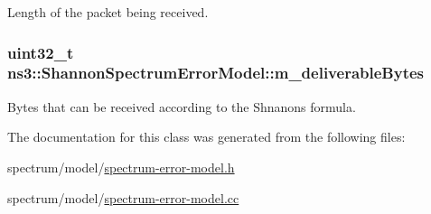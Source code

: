 Length of the packet being received. 

\subsubsection[{\texorpdfstring{m\+\_\+deliverable\+Bytes}{m_deliverableBytes}}]{\setlength{\rightskip}{0pt plus 5cm}uint32\+\_\+t ns3\+::\+Shannon\+Spectrum\+Error\+Model\+::m\+\_\+deliverable\+Bytes\hspace{0.3cm}{\ttfamily [private]}}\hypertarget{classns3_1_1ShannonSpectrumErrorModel_ab853a4be32cc3b07c30c4cd3182de48f}{}\label{classns3_1_1ShannonSpectrumErrorModel_ab853a4be32cc3b07c30c4cd3182de48f}


Bytes that can be received according to the Shnanon\textquotesingle{}s formula. 



The documentation for this class was generated from the following files\+:\begin{DoxyCompactItemize}
\item 
spectrum/model/\hyperlink{spectrum-error-model_8h}{spectrum-\/error-\/model.\+h}\item 
spectrum/model/\hyperlink{spectrum-error-model_8cc}{spectrum-\/error-\/model.\+cc}\end{DoxyCompactItemize}
